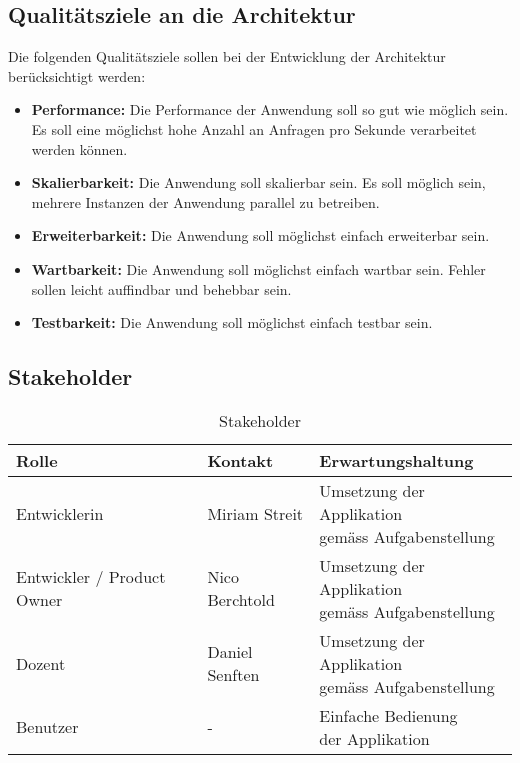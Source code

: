 \subsection{Qualitätsziele an die Architektur}
\label{subsec:qualitaetsziele}
Die folgenden Qualitätsziele sollen bei der Entwicklung der Architektur berücksichtigt werden:

\begin{itemize}
    \item \textbf{Performance:} Die Performance der Anwendung soll so gut wie möglich sein.
    Es soll eine möglichst hohe Anzahl an Anfragen pro Sekunde verarbeitet werden können.
    \item \textbf{Skalierbarkeit:} Die Anwendung soll skalierbar sein. Es soll möglich sein,
    mehrere Instanzen der Anwendung parallel zu betreiben.
    \item \textbf{Erweiterbarkeit:} Die Anwendung soll möglichst einfach erweiterbar sein. 
    \item \textbf{Wartbarkeit:} Die Anwendung soll möglichst einfach wartbar sein.
    Fehler sollen leicht auffindbar und behebbar sein.
    \item \textbf{Testbarkeit:} Die Anwendung soll möglichst einfach testbar sein.
\end{itemize}

\subsection{Stakeholder}
\label{subsec:stakeholder}

\begin{table}[H]
    \centering
    \begin{tabular}{|l|l|l|}
        \hline
        \textbf{Rolle}              & \textbf{Kontakt}  & \textbf{Erwartungshaltung} \\ \hline

        Entwicklerin                & Miriam Streit     & \makecell{Umsetzung der Applikation \\ gemäss Aufgabenstellung} \\ \hline
        Entwickler / Product Owner  & Nico Berchtold    & \makecell{Umsetzung der Applikation \\ gemäss Aufgabenstellung} \\ \hline
        Dozent                      & Daniel Senften    & \makecell{Umsetzung der Applikation \\ gemäss Aufgabenstellung} \\ \hline
        Benutzer                    & -                 & \makecell{Einfache Bedienung \\ der Applikation} \\ \hline
    \end{tabular}
    \caption{Stakeholder}
    \label{tab:stakeholder}
\end{table}